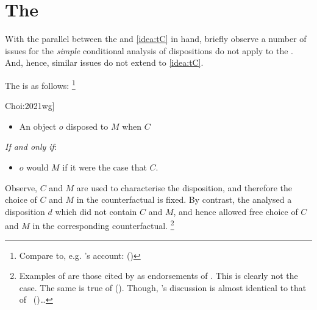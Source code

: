 \section{The \dSCA{}}
\label{sec:dsca2}


\begin{note}
  With the parallel between the \dBCAa{} and \autoref{idea:tC} in hand, briefly observe a number of issues for the \emph{simple} conditional analysis of dispositions do not apply to the \dBCAa{}.
  And, hence, similar issues do not extend to \autoref{idea:tC}.

  The \dSCA{} is as follows:%
  \footnote{
    Compare to, e.g. \citeauthor{Lewis:1997wg}'s account:
    (\citeyear[143]{Lewis:1997wg})
  }

  \begin{sketch}[The \dSCA{} --- \dSCAa{}, cf.\ \cite[\S1.2]{Choi:2021wg}]%
    \label{sketch:dSCA}
    \vspace{-\baselineskip}
    \begin{itemize}
    \item
      An object \(o\) disposed to \(M\) when \(C\)
    \end{itemize}
    \emph{If and only if}:
    \begin{itemize}
    \item
      \(o\) would \(M\) if it were the case that \(C\).
    \end{itemize}
    \vspace{-\baselineskip}
  \end{sketch}

  \noindent%
  Observe, \(C\) and \(M\) are used to characterise the disposition, and therefore the choice of \(C\) and \(M\) in the counterfactual is fixed.
  By contrast, the \dBCAa{} analysed a disposition \(d\) which did not contain \(C\) and \(M\), and hence allowed free choice of \(C\) and \(M\) in the corresponding counterfactual.%
    \footnote{
    Examples of  are those cited by \citeauthor{Choi:2021wg} as endorsements of .
    This is clearly not the case.
    The same is true of \citeauthor{Manley:2008aa} (\citeyear[60]{Manley:2008aa}).
    Though, \citeauthor{Manley:2008aa}'s discussion is almost identical to that of \citeauthor{Fara:2006aa}~(\citeyear[\S2.1]{Fara:2006aa})\dots

}
\end{note}
